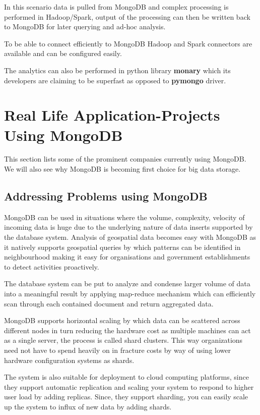\documentclass[9pt,twocolumn,twoside]{styles/osajnl}
\begin{document}
In this scenario data is pulled from MongoDB and complex processing is performed in Hadoop/Spark, output of the processing can then be written back to MongoDB for later querying and ad-hoc analysis.

To be able to connect efficiently to MongoDB Hadoop and Spark connectors are available and can be configured easily.

The analytics can also be performed in python library {\bfseries monary} which its developers are claiming to be superfast as opposed to {\bfseries pymongo} driver.

\section{Real Life Application-Projects Using MongoDB}

This section lists some of the prominent companies currently using MongoDB. We will also see why MongoDB is becoming first choice for big data storage. 

\subsection{Addressing Problems using MongoDB}

MongoDB can be used in situations where the volume, complexity, velocity of incoming data is huge due to the underlying nature of data inserts supported by the database system. Analysis of geospatial data becomes easy with MongoDB as it natively supports geospatial queries by which patterns can be identified in neighbourhood making it easy for organisations and government establishments to detect activities proactively.

The database system can be put to analyze and condense larger volume of data into a meaningful result by applying map-reduce mechanism which can efficiently scan through each contained document and return aggregated data. \cite{www-mongo12}

MongoDB supports horizontal scaling by which data can be scattered across different nodes in turn reducing the hardware cost as multiple machines can act as a single server, the process is called shard clusters. This way organizations need not have to spend heavily on in fracture costs by way of using lower hardware configuration systems as shards.

\cite{www-mongo2} The system is also suitable for deployment to cloud computing platforms, since they support automatic replication and scaling your system to respond to higher user load by adding replicas. Since, they support sharding, you can easily scale up the system to influx of new data by adding shards.
\end{document}
